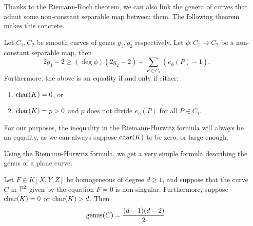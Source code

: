 Thanks to the Riemann-Roch theorem, we can also link the genera of 
curves that admit some non-constant separable map between them.
The following theorem makes this concrete.
\begin{theorem}
	\label{thm:riemann-hurwitz}
	Let $C_1, C_2$ be smooth curves of genus $g_1, g_2$ respectively.
	Let $\phi: C_1 \to C_2$ be a non-constant separable map, then
	\begin{equation*}
		2g_1 - 2 \geq (\deg \phi) (2g_2 - 2) + \sum_{P \in C_1}(e_\phi(P) - 1).
	\end{equation*}
	Furthermore, the above is an equality if and only if either:
	\begin{enumerate}[itemsep=0em, label=(\roman*)]
		\item $\operatorname{char}(K) = 0$, or
		\item $\operatorname{char}(K) = p > 0$ and $p$ does not divide $e_\phi(P)$ for all
			$P \in C_1$.
	\end{enumerate}
\end{theorem}

For our purposes, the inequality in the Riemann-Hurwitz formula
will always be an equality, as we can always suppose $\operatorname{char}(K)$ to be
zero, or large enough.

Using the Riemann-Hurwitz formula, we get a very simple formula describing
the genus of a plane curve.
\begin{corollary}
	\label{cor:genus-formula}
	Let $F \in K[X, Y, Z]$ be homogeneous of degree $d \geq 1$, and suppose that
	the curve $C$ in $\mathbb{P}^2$ given by the equation $F = 0$ is non-singular.
	Furthermore, suppose $\operatorname{char}(K) = 0$ or $\operatorname{char}(K) > d$.
	Then
	\begin{equation*}
		\operatorname{genus}(C) = \frac{(d-1)(d-2)}{2}.
	\end{equation*}
\end{corollary}

